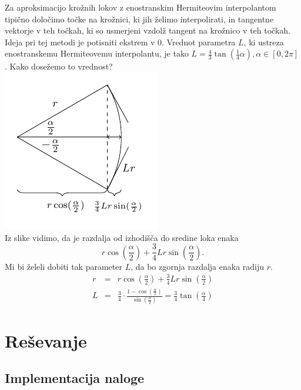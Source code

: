 \documentclass[a4paper,12pt]{article}
\begin{document}
	Za aproksimacijo krožnih lokov z enostranskim Hermiteovim interpolantom tipično določimo točke na krožnici, ki jih želimo interpolirati, 
	in tangentne vektorje v teh točkah, ki so usmerjeni vzdolž tangent na krožnico v teh točkah. Ideja pri tej metodi je potisniti ekstrem v $0$. 
	Vrednot parametra $L$, ki ustreza enostranskemu Hermiteovemu interpolantu, je tako $L = \frac{4}{3} \tan(\frac{1}{4}\alpha), \alpha \in [0,2\pi]$.
	Kako dosežemo to vrednost? \\
	\noindent\hspace*{10em}
	\includegraphics[scale=1.5]{slika.pdf} 
	\\
	Iz slike vidimo, da je razdalja od izhodišča do sredine loka enaka 
	$$r\cos(\frac{\alpha}{2}) + \frac{3}{4}Lr\sin(\frac{\alpha}{2}).$$
	Mi bi želeli dobiti tak parameter $L$, da bo zgornja razdalja enaka radiju $r$.
	\begin{eqnarray*}
		r &=& r\cos(\frac{\alpha}{2}) + \frac{3}{4}Lr\sin(\frac{\alpha}{2})\\
		L &=& \frac{3}{4} \cdot \frac{1-\cos(\frac{\alpha}{2})}{\sin(\frac{\alpha}{2})} = \frac{3}{4}\tan(\frac{\alpha}{4})
	\end{eqnarray*}
	
	\section{Reševanje}
	\subsection{Implementacija naloge}
	
\end{document}
